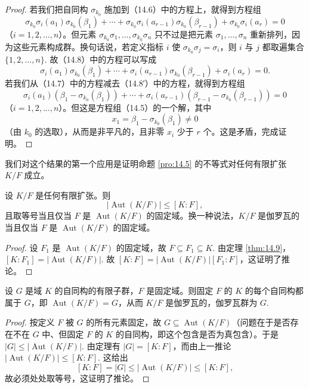 \begin{proof}
若我们把自同构 \(\sigma_{k_0}\) 施加到（14.6）中的方程上，就得到方程组
\begin{equation}
\sigma_{k_0}\sigma_i(a_1)\sigma_{k_0}(\beta_1)+\cdots+\sigma_{k_0}\sigma_i(a_{r-1})\sigma_{k_0}(\beta_{r-1})+\sigma_{k_0}\sigma_i(a_r) = 0 \tag{14.8}
\end{equation}
（\(i = 1, 2, \ldots, n\)）。但元素 \(\sigma_{k_0}\sigma_1, \ldots, \sigma_{k_0}\sigma_n\) 只不过是把元素 \(\sigma_1, \ldots, \sigma_n\) 重新排列，因为这些元素构成群。换句话说，若定义指标 \(i\) 使 \(\sigma_{k_0}\sigma_j = \sigma_i\)，则 \(i\) 与 \(j\) 都取遍集合 \(\{1, 2, \ldots, n\}\). 故（14.8）中的方程可以写成
\begin{equation}
\sigma_i(a_1)\sigma_{k_0}(\beta_1)+\cdots+\sigma_i(a_{r-1})\sigma_{k_0}(\beta_{r-1})+\sigma_i(a_r) = 0. \tag{14.8′}
\end{equation}
若我们从（14.7）中的方程减去（14.8′）中的方程，就得到方程组
\[
\sigma_i(a_1)(\beta_1-\sigma_{k_0}(\beta_1))+\cdots+\sigma_i(a_{r-1})(\beta_{r-1}-\sigma_{k_0}(\beta_{r-1})) = 0
\]
（\(i = 1, 2, \ldots, n\)）。但这是方程组（14.5）的一个解，其中
\[
x_1 = \beta_1-\sigma_{k_0}(\beta_1) \neq 0
\]
（由 \(k_0\) 的选取），从而是非平凡的，且非零 \(x_i\) 少于 \(r\) 个。这是矛盾，完成证明。
\end{proof}

我们对这个结果的第一个应用是证明命题 \ref{pro:14.5} 的不等式对任何有限扩张 \(K/F\) 成立。

\begin{corollary}\label{cor:14.10}
设 \(K/F\) 是任何有限扩张。则
\[
|\operatorname{Aut}(K/F)| \leq [K:F],
\]
且取等号当且仅当 \(F\) 是 \(\operatorname{Aut}(K/F)\) 的固定域。换一种说法，\(K/F\) 是伽罗瓦的当且仅当 \(F\) 是 \(\operatorname{Aut}(K/F)\) 的固定域。
\end{corollary}

\begin{proof}
设 \(F_1\) 是 \(\operatorname{Aut}(K/F)\) 的固定域，故 \(F \subseteq F_1 \subseteq K\). 由定理 \ref{thm:14.9}，\([K:F_1] = |\operatorname{Aut}(K/F)|\). 故 \([K:F] = |\operatorname{Aut}(K/F)|[F_1:F]\)，这证明了推论。
\end{proof}

\begin{corollary}\label{cor:14.11}
设 \(G\) 是域 \(K\) 的自同构的有限子群，\(F\) 是固定域。则固定 \(F\) 的 \(K\) 的每个自同构都属于 \(G\)，即 \(\operatorname{Aut}(K/F) = G\)，从而 \(K/F\) 是伽罗瓦的，伽罗瓦群为 \(G\).
\end{corollary}

\begin{proof}
按定义 \(F\) 被 \(G\) 的所有元素固定，故 \(G \subseteq \operatorname{Aut}(K/F)\)（问题在于是否存在不在 \(G\) 中、但固定 \(F\) 的 \(K\) 的自同构，即这个包含是否为真包含）。于是 \(|G| \leq |\operatorname{Aut}(K/F)|\). 由定理有 \(|G| = [K:F]\)，而由上一推论 \(|\operatorname{Aut}(K/F)| \leq [K:F]\). 这给出
\[
[K:F] = |G| \leq |\operatorname{Aut}(K/F)| \leq [K:F],
\]
故必须处处取等号，这证明了推论。
\end{proof}

